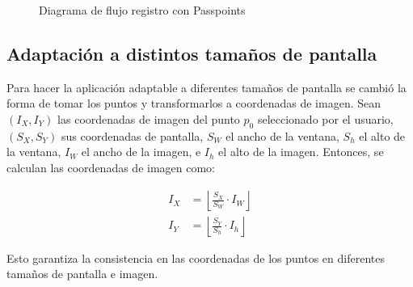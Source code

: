 \begin{figure}[H]
\begin{minipage}[b]{0.5\linewidth}
		\caption{Diagrama de flujo registro con Passpoints}
	
	\end{minipage} %
		\label{flujo_app}
\end{figure}


\subsection{Adaptaci\'on a distintos tama\~nos de pantalla}
Para hacer la aplicaci\'on adaptable a diferentes tama\~nos de pantalla se cambi\'o la forma de tomar los puntos y transformarlos a coordenadas de imagen.
Sean $(I_X, I_Y)$ las coordenadas de imagen del punto $p_0$ seleccionado por el usuario, $(S_X, S_Y)$ sus coordenadas de pantalla, $S_W$ el ancho de la ventana, $S_h$ el alto de la ventana, $I_W$ el ancho de la imagen, e $I_h$ el alto de la imagen. Entonces, se calculan las coordenadas de imagen como:

\begin{align*}
	I_X &= \left\lfloor \frac{S_X}{S_W} \cdot I_W \right\rfloor \\
	I_Y &= \left\lfloor \frac{S_Y}{S_h} \cdot I_h \right\rfloor
\end{align*}

Esto garantiza la consistencia en las coordenadas de los puntos en diferentes tamaños de pantalla e imagen.

